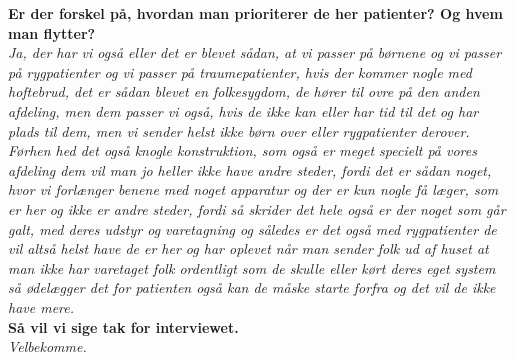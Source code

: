 \noindent
\textbf{Er der forskel på, hvordan man prioriterer de her patienter? Og hvem man flytter?}\\
\noindent
\textit{Ja, der har vi også eller det er blevet sådan, at vi passer på børnene og vi passer på rygpatienter og vi passer på traumepatienter, hvis der kommer nogle med hoftebrud, det er sådan blevet en folkesygdom, de hører til ovre på den anden afdeling, men dem passer vi også, hvis de ikke kan eller har tid til det og har plads til dem, men vi sender helst ikke børn over eller rygpatienter derover. Førhen hed det også knogle konstruktion, som også er meget specielt på vores afdeling dem vil man jo heller ikke have andre steder, fordi det er sådan noget, hvor vi forlænger benene med noget apparatur og der er kun nogle få læger, som er her og ikke er andre steder, fordi så skrider det hele også er der noget som går galt, med deres udstyr og varetagning og således er det også med rygpatienter de vil altså helst have de er her og har oplevet når man sender folk ud af huset at man ikke har varetaget folk ordentligt som de skulle eller kørt deres eget system så ødelægger det for patienten også kan de måske starte forfra og det vil de ikke have mere.}   \\
\noindent
\textbf{Så vil vi sige tak for interviewet.}\\
\noindent
\textit{Velbekomme.}\\


